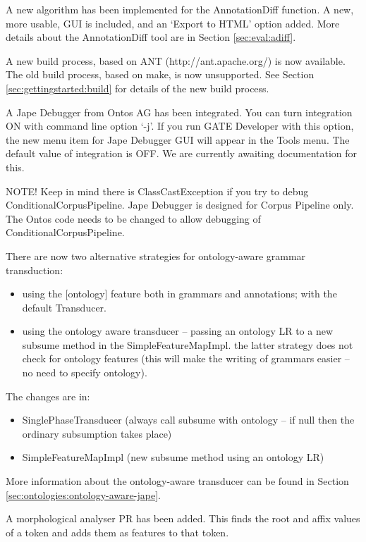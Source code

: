 
A new algorithm has been implemented for the AnnotationDiff function. A new,
more usable, GUI is included, and an `Export to HTML' option added. More
details about the AnnotationDiff tool are in Section \ref{sec:eval:adiff}.

A new build process, based on ANT (http://ant.apache.org/) is now
available. The old build process, based on make, is now
unsupported. See Section \ref{sec:gettingstarted:build} for details of the new
build process.

A Jape Debugger from Ontos AG has been integrated. You can turn
integration ON with command line option `-j'. If you run GATE Developer with
this option, the new menu item for Jape Debugger GUI will appear in the
Tools menu. The default value of integration is OFF. We are currently
awaiting documentation for this.

NOTE! Keep in mind there is ClassCastException if you try to debug
ConditionalCorpusPipeline. Jape Debugger is designed for Corpus Pipeline
only. The Ontos code needs to be changed to allow debugging of
ConditionalCorpusPipeline.



There are now two alternative strategies for ontology-aware grammar
transduction:
%
\begin{itemize}
%
\item using the [ontology] feature both in grammars and annotations; with the
default Transducer.
%
\item using the ontology aware transducer -- passing an ontology LR to a new
subsume method in the SimpleFeatureMapImpl. the latter strategy does not
check for ontology features (this will make the writing of grammars
easier -- no need to specify ontology).
%
\end{itemize}

The changes are in:
%
\begin{itemize}
%
\item SinglePhaseTransducer (always call subsume with ontology -- if null
then the ordinary subsumption takes place)
%
\item SimpleFeatureMapImpl (new subsume method using an ontology LR)
%
\end{itemize}
%
More information about the ontology-aware transducer can be found in Section
\ref{sec:ontologies:ontology-aware-jape}.

A morphological analyser PR has been added. This finds the root and
affix values of a token and adds them as features to that token.

